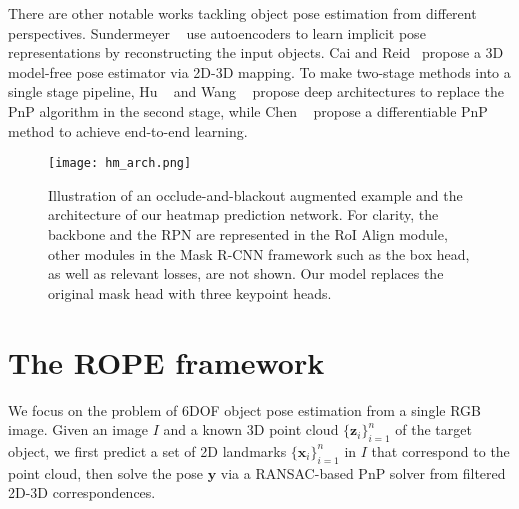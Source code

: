 \documentclass[10pt,twocolumn,letterpaper]{article}
\newcommand{\bx}{\bm{x}}
\newcommand{\by}{\bm{y}}
\newcommand{\bz}{\bm{z}}
\begin{document}
There are other notable works tackling object pose estimation from different perspectives. Sundermeyer \etal~\cite{sundermeyer2020augmented, sundermeyer2020multi} use autoencoders to learn implicit pose representations by reconstructing the input objects. Cai and Reid~\cite{Cai2020reconstruct} propose a 3D model-free pose estimator via 2D-3D mapping. To make two-stage methods into a single stage pipeline, Hu \etal~\cite{Hu2020single} and Wang \etal~\cite{wang2021gdr} propose deep architectures to replace the PnP algorithm in the second stage, while Chen \etal~\cite{Chen2020end} propose a differentiable PnP method to achieve end-to-end learning. 






























\begin{figure*}[t]
    \centering
    \texttt{[image: hm\_arch.png]}
    \caption{Illustration of an occlude-and-blackout augmented example and the architecture of our heatmap prediction network. For clarity, the backbone and the RPN are represented in the RoI Align module, other modules in the Mask R-CNN framework such as the box head, as well as relevant losses, are not shown. Our model replaces the original mask head with three keypoint heads.}
    \label{fig:hm_arch}
\end{figure*}

\section{The ROPE framework}

We focus on the problem of 6DOF object pose estimation from a single RGB image. Given an image $I$ and a known 3D point cloud $\{ \bz_i \}^{n}_{i=1}$ of the target object, we first predict a set of 2D landmarks $\{ \bx_i \}^{n}_{i=1}$ in $I$ that correspond to the point cloud, then solve the pose $\by$ via a RANSAC-based PnP solver from filtered 2D-3D correspondences. 
\end{document}
